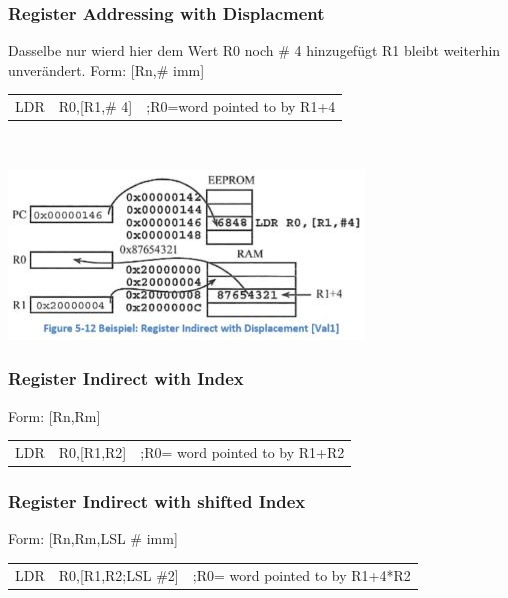 \begin{multicols}{2}
    \begin{minipage}{\linewidth}
        \subsubsection{Register Addressing with Displacment}
        Dasselbe nur wierd hier dem Wert R0 noch \# 4 hinzugefügt\newline
        R1 bleibt weiterhin unverändert.\newline
        Form: [Rn,\# imm]\newline
        \begin{tabular}{lll}
            LDR & R0,[R1,\# 4]&;R0=word pointed to by R1+4 \\ 
        \end{tabular} \\
    \end{minipage}
    \includegraphics[width=0.9\linewidth]{images/AddressingDisplacment}    
\end{multicols} 

\subsubsection{Register Indirect with Index}
Form: [Rn,Rm]\newline
\begin{tabular}{lll}
   LDR &R0,[R1,R2]  &;R0= word pointed to by R1+R2 \\ 
\end{tabular} 

\subsubsection{Register Indirect with shifted Index}
Form: [Rn,Rm,LSL \# imm]\newline
\begin{tabular}{lll}
    LDR&R0,[R1,R2;LSL \#2]  &;R0= word pointed to by R1+4*R2  \\ 
\end{tabular} 

